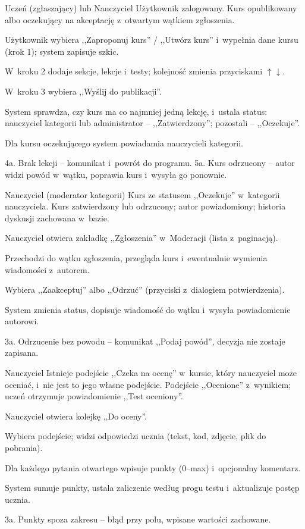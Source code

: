 {Uczeń (zgłaszający) lub Nauczyciel}
{Użytkownik zalogowany.}
{Kurs opublikowany albo oczekujący na akceptację z~otwartym wątkiem zgłoszenia.}
{\item Użytkownik wybiera ,,Zaproponuj kurs'' / ,,Utwórz kurs'' i~wypełnia dane kursu (krok 1); system zapisuje szkic.
 \item W~kroku 2 dodaje sekcje, lekcje i~testy; kolejność zmienia przyciskami $\uparrow\downarrow$.
 \item W~kroku 3 wybiera ,,Wyślij do publikacji''.
 \item System sprawdza, czy kurs ma co najmniej jedną lekcję, i~ustala status: nauczyciel kategorii lub administrator -- ,,Zatwierdzony''; pozostali -- ,,Oczekuje''.
 \item Dla kursu oczekującego system powiadamia nauczycieli kategorii.}
{4a. Brak lekcji -- komunikat i~powrót do programu.\newline
5a. Kurs odrzucony -- autor widzi powód w~wątku, poprawia kurs i~wysyła go ponownie.}

{Nauczyciel (moderator kategorii)}
{Kurs ze statusem ,,Oczekuje'' w~kategorii nauczyciela.}
{Kurs zatwierdzony lub odrzucony; autor powiadomiony; historia dyskusji zachowana w~bazie.}
{\item Nauczyciel otwiera zakładkę ,,Zgłoszenia'' w~Moderacji (lista z~paginacją).
 \item Przechodzi do wątku zgłoszenia, przegląda kurs i~ewentualnie wymienia wiadomości z~autorem.
 \item Wybiera ,,Zaakceptuj'' albo ,,Odrzuć'' (przyciski z~dialogiem potwierdzenia).
 \item System zmienia status, dopisuje wiadomość do wątku i~wysyła powiadomienie autorowi.}
{3a. Odrzucenie bez powodu -- komunikat ,,Podaj powód'', decyzja nie zostaje zapisana.}

{Nauczyciel}
{Istnieje podejście ,,Czeka na ocenę'' w~kursie, który nauczyciel może oceniać, i~nie jest to jego własne podejście.}
{Podejście ,,Ocenione'' z~wynikiem; uczeń otrzymuje powiadomienie ,,Test oceniony''.}
{\item Nauczyciel otwiera kolejkę ,,Do oceny''.
 \item Wybiera podejście; widzi odpowiedzi ucznia (tekst, kod, zdjęcie, plik do pobrania).
 \item Dla każdego pytania otwartego wpisuje punkty (0--max) i~opcjonalny komentarz.
 \item System sumuje punkty, ustala zaliczenie według progu testu i~aktualizuje postęp ucznia.}
{3a. Punkty spoza zakresu -- błąd przy polu, wpisane wartości zachowane.}


